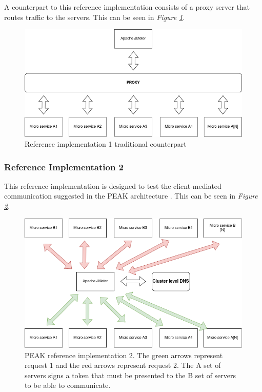 \documentclass[12pt]{article}
\begin{document}
A counterpart to this reference implementation consists of a proxy server that routes traffic to the servers. This can be seen in \textit{Figure \ref{fig:test-one-traditional}}.

\begin{figure}[H]
    \centering
    \includegraphics[width=\textwidth]{test-one-traditional.drawio.png}
    \caption{Reference implementation 1 traditional counterpart}
    \label{fig:test-one-traditional}
\end{figure}

\subsubsection{Reference Implementation 2}
This reference implementation is designed to test the client-mediated communication suggested in the PEAK architecture \cite{heimonenPreprintPEAKProxy}.
This can be seen in \textit{Figure \ref{fig:test-two}}.

\begin{figure}[H]
    \centering
    \includegraphics[width=\textwidth]{test-two.drawio.png}
    \caption{PEAK reference implementation 2. The green arrows represent request 1 and the red arrows represent request 2.
    The A set of servers signs a token that must be presented to the B set of servers to be able to communicate.}
    \label{fig:test-two}
\end{figure}
\end{document}
